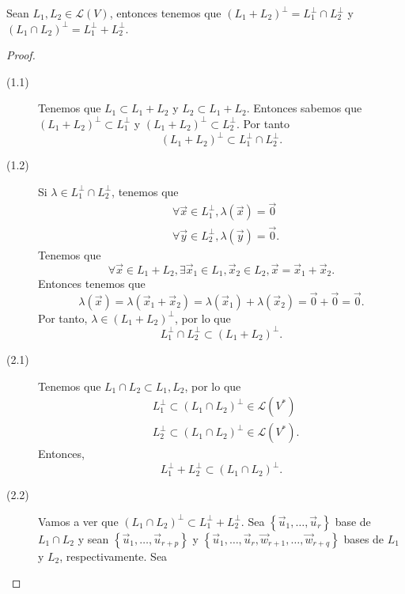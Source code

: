 \begin{fprop}[]
\normalfont Sean $\displaystyle L_{1}, L_{2} \in \mathcal{L}\left(V\right) $, entonces tenemos que $\displaystyle \left(L_{1}+L_{2}\right)^{\perp} = L_{1}^{\perp} \cap L_{2}^{\perp} $ y $\displaystyle \left(L_{1}\cap L_{2}\right)^{\perp} = L_{1}^{\perp} + L_{2}^{\perp} $. 
\end{fprop}

\begin{proof}
\begin{description}
\item[(1.1)]  Tenemos que $\displaystyle L_{1} \subset L_{1} + L_{2} $ y $\displaystyle L_{2} \subset L_{1}+L_{2} $. Entonces sabemos que $\displaystyle \left(L_{1}+L_{2}\right)^{\perp} \subset L_{1}^{\perp} $ y $\displaystyle \left(L_{1}+L_{2}\right)^{\perp}\subset L_{2}^{\perp} $. Por tanto
\[\left(L_{1}+L_{2}\right)^{\perp} \subset L_{1}^{\perp} \cap L_{2}^{\perp} .\]
\item[(1.2)] Si $\displaystyle \lambda \in L_{1}^{\perp} \cap L_{2}^{\perp} $, tenemos que 
\[
\begin{split}
&  \forall \vec{x} \in L_{1}^{\perp}, \lambda\left(\vec{x}\right) = \vec{0} \\
& \forall \vec{y} \in L_{2}^{\perp}, \lambda\left(\vec{y}\right) = \vec{0}.
\end{split}
\]
Tenemos que 
\[\forall\vec{x} \in L_{1}+L_{2}, \exists\vec{x}_{1}\in L_{1}, \vec{x}_{2} \in L_{2}, \vec{x} = \vec{x}_{1} +\vec{x}_{2} .\]
Entonces tenemos que 
\[\lambda\left(\vec{x}\right) = \lambda\left(\vec{x}_{1}+\vec{x}_{2}\right) = \lambda\left(\vec{x}_{1}\right)+\lambda\left(\vec{x}_{2}\right) = \vec{0} + \vec{0} = \vec{0} .\]
Por tanto, $\displaystyle \lambda \in \left(L_{1}+L_{2}\right)^{\perp} $, por lo que 
\[L_{1}^{\perp} \cap L_{2}^{\perp} \subset \left(L_{1}+L_{2}\right)^{\perp} .\]
\item[(2.1)] Tenemos que $\displaystyle L_{1}\cap L_{2} \subset L_{1}, L_{2} $, por lo que 
	\[
	\begin{split}
	& L_{1}^{\perp}\subset \left(L_{1}\cap L_{2}\right)^{\perp} \in \mathcal{L}\left(V^{*}\right) \\
	& L_{2}^{\perp} \subset \left(L_{1}\cap L_{2}\right)^{\perp} \in \mathcal{L}\left(V^{*}\right).
	\end{split}
	\]
Entonces, 
\[L_{1}^{\perp} + L_{2}^{\perp} \subset \left(L_{1} \cap L_{2}\right)^{\perp} .\]
\item[(2.2)] Vamos a ver que $\displaystyle \left(L_{1}\cap L_{2}\right)^{\perp} \subset L_{1}^{\perp} + L_{2}^{\perp} $. Sea $\displaystyle \left\{ \vec{u}_{1}, \ldots, \vec{u}_{r}\right\}  $ base de $\displaystyle L_{1}\cap L_{2} $ y sean $\displaystyle \left\{ \vec{u}_{1}, \ldots, \vec{u}_{r+p}\right\}  $ y $\displaystyle \left\{ \vec{u}_{1}, \ldots, \vec{u}_{r}, \vec{w}_{r+1}, \ldots, \vec{w}_{r+q}\right\}  $ bases de $\displaystyle L_{1} $ y $\displaystyle L_{2} $, respectivamente. Sea 

\end{description}
\end{proof}
